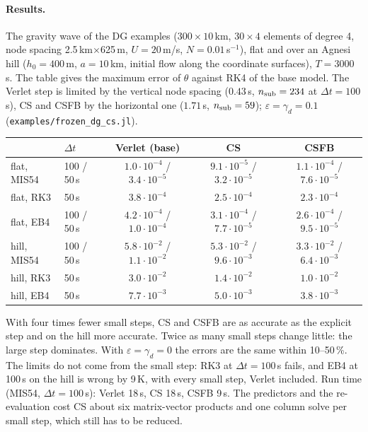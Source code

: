 \documentclass[11pt,a4paper]{article}
\newcommand{\dt}{\Delta t}
\newcommand{\code}[1]{\texttt{#1}}
\begin{document}
\paragraph{Results.} The gravity wave of the DG examples ($300\times10$\,km, $30\times4$ elements of degree 4,
node spacing 2.5\,km$\times$625\,m, $U=20$\,m/s, $N=0.01$\,s$^{-1}$), flat and over an Agnesi hill ($h_0=400$\,m,
$a=10$\,km, initial flow along the coordinate surfaces), $T=3000$\,s. The table gives the maximum error of
$\theta$ against RK4 of the base model. The Verlet step is limited by the vertical node spacing
($0.43$\,s, $n_{\rm sub}=234$ at $\dt=100$\,s), CS and CSFB by the horizontal one
($1.71$\,s, $n_{\rm sub}=59$); $\varepsilon=\gamma_d=0.1$ (\code{examples/frozen\_dg\_cs.jl}).
\begin{center}\small
\begin{tabular}{llccc}\toprule
 & $\dt$ & Verlet (base) & CS & CSFB\\\midrule
flat, MIS54 & 100 / 50\,s & $1.0\cdot10^{-4}$ / $3.4\cdot10^{-5}$ & $9.1\cdot10^{-5}$ / $3.2\cdot10^{-5}$ & $1.1\cdot10^{-4}$ / $7.6\cdot10^{-5}$\\
flat, RK3 & 50\,s & $3.8\cdot10^{-4}$ & $2.5\cdot10^{-4}$ & $2.3\cdot10^{-4}$\\
flat, EB4 & 100 / 50\,s & $4.2\cdot10^{-4}$ / $1.0\cdot10^{-4}$ & $3.1\cdot10^{-4}$ / $7.7\cdot10^{-5}$ & $2.6\cdot10^{-4}$ / $9.5\cdot10^{-5}$\\
hill, MIS54 & 100 / 50\,s & $5.8\cdot10^{-2}$ / $1.1\cdot10^{-2}$ & $5.3\cdot10^{-2}$ / $9.6\cdot10^{-3}$ & $3.3\cdot10^{-2}$ / $6.4\cdot10^{-3}$\\
hill, RK3 & 50\,s & $3.0\cdot10^{-2}$ & $1.4\cdot10^{-2}$ & $1.0\cdot10^{-2}$\\
hill, EB4 & 50\,s & $7.7\cdot10^{-3}$ & $5.0\cdot10^{-3}$ & $3.8\cdot10^{-3}$\\\bottomrule
\end{tabular}
\end{center}
With four times fewer small steps, CS and CSFB are as accurate as the explicit step and on the hill
more accurate. Twice as many small steps change little: the large step dominates. With
$\varepsilon=\gamma_d=0$ the errors are the same within 10--50\,\%. The limits do not come from the small step: RK3 at
$\dt=100$\,s fails, and EB4 at 100\,s on the hill is wrong by 9\,K, with every small step, Verlet included. Run time
(MIS54, $\dt=100$\,s): Verlet 18\,s, CS 18\,s, CSFB 9\,s. The predictors and the re-evaluation cost
CS about six matrix-vector products and one column solve per small step, which still has to be reduced.
\end{document}
